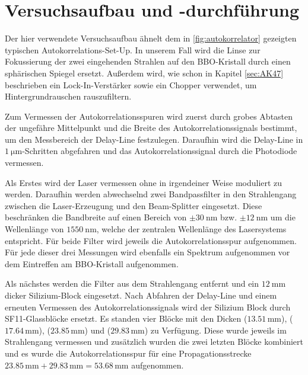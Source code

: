 \newpage
\section{Versuchsaufbau und -durchführung}
  Der hier verwendete Versuchsaufbau ähnelt dem in \ref{fig:autokorrelator} gezeigten typischen Autokorrelations-Set-Up. In unserem Fall wird die Linse zur Fokussierung der zwei eingehenden Strahlen auf den BBO-Kristall durch einen sphärischen Spiegel ersetzt. Außerdem wird, wie schon in Kapitel \ref{sec:AK47} beschrieben ein Lock-In-Verstärker sowie ein Chopper verwendet, um Hintergrundrauschen rauszufiltern.

  Zum Vermessen der Autokorrelationsspuren wird zuerst durch grobes Abtasten der ungefähre Mittelpunkt und die Breite des Autokorrelationssignals bestimmt, um den Messbereich der Delay-Line festzulegen. Daraufhin wird die Delay-Line in $\SI{1}{\micro\metre}$-Schritten abgefahren und das Autokorrelationssignal durch die Photodiode vermessen.

  Als Erstes wird der Laser vermessen ohne in irgendeiner Weise moduliert zu werden. Daraufhin werden abwechselnd zwei Bandpassfilter in den Strahlengang zwischen die Laser-Erzeugung und den Beam-Splitter eingesetzt. Diese beschränken die Bandbreite auf einen Bereich von $\pm \SI{30}{\nano\metre}$ bzw. $\pm \SI{12}{\nano\metre}$ um die Wellenlänge von $\SI{1550}{\nano\metre}$, welche der zentralen Wellenlänge des Lasersystems entspricht. Für beide Filter wird jeweils die Autokorrelationsspur aufgenommen.
  Für jede dieser drei Messungen wird ebenfalls ein Spektrum aufgenommen vor dem Eintreffen am BBO-Kristall aufgenommen.

  Als nächstes werden die Filter aus dem Strahlengang entfernt und ein $\SI{12}{\milli\metre}$ dicker Silizium-Block eingesetzt. Nach Abfahren der Delay-Line und einem erneuten Vermessen des Autokorrelationssignals wird der Silizium Block durch SF11-Glassblöcke ersetzt. Es standen vier Blöcke mit den Dicken ($13.51\,\text{mm}$), ($17.64\,\text{mm}$), ($23.85\,\text{mm}$) und ($29.83\,\text{mm}$) zu Verfügung. Diese wurde jeweils im Strahlengang vermessen und zusätzlich wurden die zwei letzten Blöcke kombiniert und es wurde die Autokorrelationsspur für eine Propagationsstrecke $23.85\,\text{mm} + 29.83\,\text{mm} = 53.68\,\text{mm}$ aufgenommen.